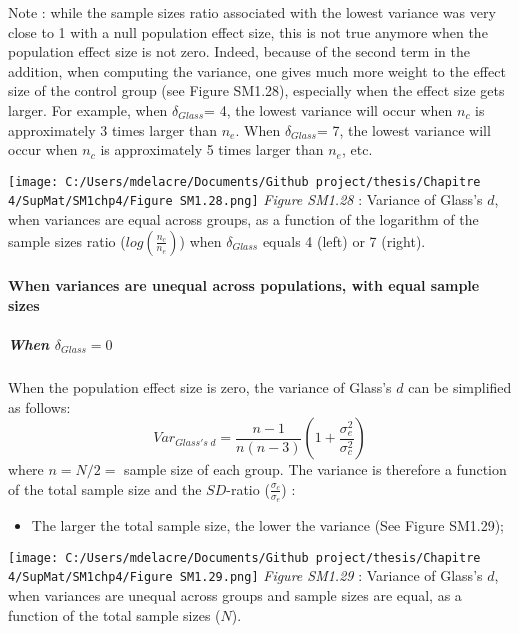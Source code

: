 \documentclass[
  english,
  man,mask,floatsintext]{apa6}
\providecommand{\tightlist}{%
  \setlength{\itemsep}{0pt}\setlength{\parskip}{0pt}}
\let\oldparagraph\paragraph
\renewcommand{\paragraph}[1]{\oldparagraph{#1}\mbox{}}
\let\oldsubparagraph\subparagraph
\renewcommand{\subparagraph}[1]{\oldsubparagraph{#1}\mbox{}}
\begin{document}
Note : while the sample sizes ratio associated with the lowest variance was very close to 1 with a null population effect size, this is not true anymore when the population effect size is not zero. Indeed, because of the second term in the addition, when computing the variance, one gives much more weight to the effect size of the control group (see Figure SM1.28), especially when the effect size gets larger. For example, when \(\delta_{Glass}\)= 4, the lowest variance will occur when \(n_c\) is approximately 3 times larger than \(n_e\). When \(\delta_{Glass}\)= 7, the lowest variance will occur when \(n_c\) is approximately 5 times larger than \(n_e\), etc.

\texttt{[image: C:/Users/mdelacre/Documents/Github project/thesis/Chapitre 4/SupMat/SM1chp4/Figure SM1.28.png]}
\emph{Figure SM1.28} : Variance of Glass's \(d\), when variances are equal across groups, as a function of the logarithm of the sample sizes ratio (\(log\left(\frac{n_c}{n_e} \right)\)) when \(\delta_{Glass}\) equals 4 (left) or 7 (right).

\hypertarget{when-variances-are-unequal-across-populations-with-equal-sample-sizes-2}{%
\paragraph{When variances are unequal across populations, with equal sample sizes}\label{when-variances-are-unequal-across-populations-with-equal-sample-sizes-2}}

\hypertarget{when-delta_glass-0}{%
\subparagraph{\texorpdfstring{When \(\delta_{Glass} = 0\)}{When \textbackslash delta\_\{Glass\} = 0}}\label{when-delta_glass-0}}

When the population effect size is zero, the variance of Glass's \(d\) can be simplified as follows:
\[Var_{Glass's \; d} = \frac{n-1}{n(n-3)} \left( 1+\frac{\sigma^2_e}{\sigma^2_c}\right)\]
where \(n=N/2=\) sample size of each group. The variance is therefore a function of the total sample size and the \(SD\)-ratio (\(\frac{\sigma_c}{\sigma_e}\)) :

\newpage

\begin{itemize}
\tightlist
\item
  The larger the total sample size, the lower the variance (See Figure SM1.29);
\end{itemize}

\texttt{[image: C:/Users/mdelacre/Documents/Github project/thesis/Chapitre 4/SupMat/SM1chp4/Figure SM1.29.png]}
\emph{Figure SM1.29} : Variance of Glass's \(d\), when variances are unequal across groups and sample sizes are equal, as a function of the total sample sizes (\(N\)).
\end{document}
